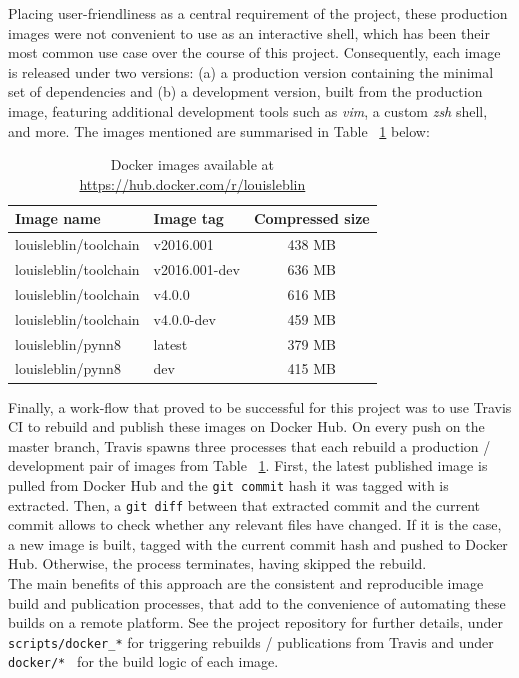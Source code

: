 Placing user-friendliness as a central requirement of the project, these production images were not convenient to use as an interactive shell, which has been their most common use case over the course of this project. Consequently, each image is released under two versions: (a) a production version containing the minimal set of dependencies and (b) a development version, built from the production image, featuring additional development tools such as \textit{vim}, a custom \textit{zsh} shell, and more. The images mentioned are summarised in Table ~\ref{table:a} below: \\

\begin{table}
\begin{center}
\begin{tabular}{ |l|l|c| }
 \hline
\textbf{Image name} & \textbf{Image tag} & \textbf{Compressed size}  \\ 
 \hline
louisleblin/toolchain & v2016.001 & 438 MB \\ 
louisleblin/toolchain & v2016.001-dev & 636 MB \\ 
louisleblin/toolchain & v4.0.0 & 616 MB \\ 
louisleblin/toolchain & v4.0.0-dev & 459 MB \\ 
louisleblin/pynn8 & latest & 379 MB \\ 
louisleblin/pynn8 & dev & 415 MB \\ 
 \hline
\end{tabular}
\end{center}
\caption{Docker images available at \url{https://hub.docker.com/r/louisleblin}}
\label{table:a}
\end{table}

Finally, a work-flow that proved to be successful for this project was to use Travis CI to rebuild and publish these images on Docker Hub. On every push on the master branch, Travis spawns three processes that each rebuild a production / development pair of images from Table ~\ref{table:a}. First, the latest published image is pulled from Docker Hub and the \texttt{git commit} hash it was tagged with is extracted. Then, a \texttt{git diff} between that extracted commit and the current commit allows to check whether any relevant files have changed. If it is the case, a new image is built, tagged with the current commit hash and pushed to Docker Hub. Otherwise, the process terminates, having skipped the rebuild. \\

The main benefits of this approach are the consistent and reproducible image build and publication processes, that add to the convenience of automating these builds on a remote platform. See the project repository for further details, under \texttt{scripts/docker\_*} for triggering rebuilds / publications from Travis and under \texttt{docker/* } for the build logic of each image.  \\

